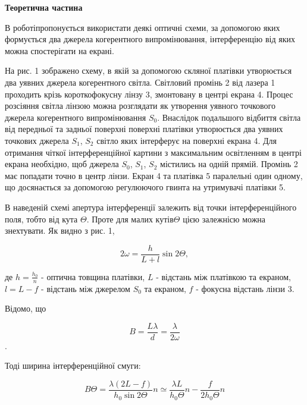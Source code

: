 \begin{center}
    \Large{\textbf{Теоретична частина}}    
\end{center}

\vspace{1mm}

В роботіпропонується використати деякі оптичні схеми, за допомогою
яких формується два джерела когерентного випромінювання, інтерференцію від
яких можна спостерігати на екрані.

На рис. 1 зображено схему, в якій за допомогою скляної 
платівки утворюється два уявних джерела когерентного світла.
Світловий промінь 2 від лазера 1 проходить крізь короткофокусну лінзу 3,
змонтовану в центрі екрана 4. Процес розсіяння світла лінзою
можна розглядати як утворення уявного точкового джерела
когерентного випромінювання $S_0$. Внаслідок подальшого відбиття
світла від передньої та задньої поверхні поверхні платівки 
утворюється два уявних точкових джерела $S_1$, $S_2$ світло
яких інтерферує на поверхні екрана 4. Для отримання чіткої інтерференційної
картини з максимальним освітленням в центрі екрана необхідно, щоб
джерела $S_0$, $S_1$, $S_2$ містились на одній прямій. Промінь 2 має попадати
точно в центр лінзи. Екран 4 та платівка 5 паралельні один
одному, що досянається за допомогою регулюючого гвинта на утримувачі платівки 5.


В наведеній схемі апертура інтерференції залежить від точки інтерференційного поля,
тобто від кута $\Theta$. Проте для малих кутів$\Theta$ цією залежнісю
можна знехтувати. Як видно з рис. 1,

\begin{equation}
    2 \omega = \frac{h}{L+l} \sin{2\Theta},
\end{equation}

де $h=\frac{h_0}{n}$ - оптична товщина платівки,
$L$  - відстань між платівкою та екраном,
$l = L - f$ - відстань між джерелом $S_0$ та екраном,
$f$ - фокусна відстань лінзи 3.

Відомо, що 

$$ B = \frac{L \lambda}{d} = \frac{\lambda}{2\omega} $$.

Тоді ширина інтерференційної смуги:

\begin{equation} \label{eq:2}
    B\Theta = \frac{\lambda(2L - f)}{h_0 \sin{2\Theta}}n \simeq 
    \frac{\lambda L}{h_0\Theta} n - \frac{f}{2 h_0 \Theta}n 
\end{equation}


